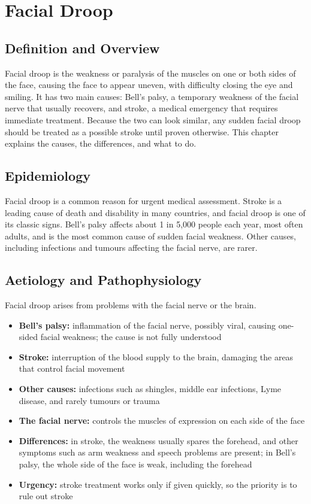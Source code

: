 \chapter{Facial Droop}

\section*{Definition and Overview}
Facial droop is the weakness or paralysis of the muscles on one or both sides of the face, causing the face to appear uneven, with difficulty closing the eye and smiling. It has two main causes: Bell's palsy, a temporary weakness of the facial nerve that usually recovers, and stroke, a medical emergency that requires immediate treatment. Because the two can look similar, any sudden facial droop should be treated as a possible stroke until proven otherwise. This chapter explains the causes, the differences, and what to do.

\section*{Epidemiology}
Facial droop is a common reason for urgent medical assessment. Stroke is a leading cause of death and disability in many countries, and facial droop is one of its classic signs. Bell's palsy affects about 1 in 5,000 people each year, most often adults, and is the most common cause of sudden facial weakness. Other causes, including infections and tumours affecting the facial nerve, are rarer.

\section*{Aetiology and Pathophysiology}
Facial droop arises from problems with the facial nerve or the brain.
\begin{itemize}
    \item \textbf{Bell's palsy:} inflammation of the facial nerve, possibly viral, causing one-sided facial weakness; the cause is not fully understood
    \item \textbf{Stroke:} interruption of the blood supply to the brain, damaging the areas that control facial movement
    \item \textbf{Other causes:} infections such as shingles, middle ear infections, Lyme disease, and rarely tumours or trauma
    \item \textbf{The facial nerve:} controls the muscles of expression on each side of the face
    \item \textbf{Differences:} in stroke, the weakness usually spares the forehead, and other symptoms such as arm weakness and speech problems are present; in Bell's palsy, the whole side of the face is weak, including the forehead
    \item \textbf{Urgency:} stroke treatment works only if given quickly, so the priority is to rule out stroke
\end{itemize}

